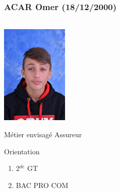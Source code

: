 \documentclass{beamer}
\begin{document}
\begin{frame}
\frametitle{ACAR Omer (18/12/2000)}  
\framesubtitle{ }	

%
%		
%		
%	
%
\begin{columns}[onlytextwidth]

\vspace*{-.5cm}

\begin{column}{0.3\textwidth}
	\begin{center}
			\includegraphics[scale=0.8]{tof}
	\end{center}

	
	\begin{block}{Métier envisagé}
		Assureur
	\end{block}
	
	\begin{alertblock}{Orientation}
		\begin{enumerate}
			\item 2$^{de}$ GT
			\item BAC PRO COM
		\end{enumerate}
	\end{alertblock}
\end{column}	


\end{columns}
\end{frame}
\end{document}
